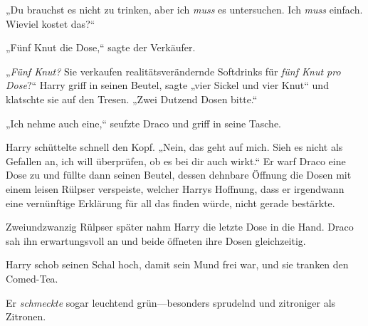 „Du brauchst es nicht zu trinken, aber ich \emph{muss} es untersuchen. Ich \emph{muss} einfach. Wieviel kostet das?“

„Fünf Knut die Dose,“ sagte der Verkäufer.

„\emph{Fünf Knut?} Sie verkaufen realitätsverändernde Softdrinks für \emph{fünf Knut pro Dose}?“ Harry griff in seinen Beutel, sagte „vier Sickel und vier Knut“ und klatschte sie auf den Tresen. „Zwei Dutzend Dosen bitte.“

„Ich nehme auch eine,“ seufzte Draco und griff in seine Tasche.

Harry schüttelte schnell den Kopf. „Nein, das geht auf mich. Sieh es nicht als Gefallen an, ich will überprüfen, ob es bei dir auch wirkt.“ Er warf Draco eine Dose zu und füllte dann seinen Beutel, dessen dehnbare Öffnung die Dosen mit einem leisen Rülpser verspeiste, welcher Harrys Hoffnung, dass er irgendwann eine vernünftige Erklärung für all das finden würde, nicht gerade bestärkte.

Zweiundzwanzig Rülpser später nahm Harry die letzte Dose in die Hand. Draco sah ihn erwartungsvoll an und beide öffneten ihre Dosen gleichzeitig.

Harry schob seinen Schal hoch, damit sein Mund frei war, und sie tranken den Comed-Tea.

Er \emph{schmeckte} sogar leuchtend grün—besonders sprudelnd und zitroniger als Zitronen.

